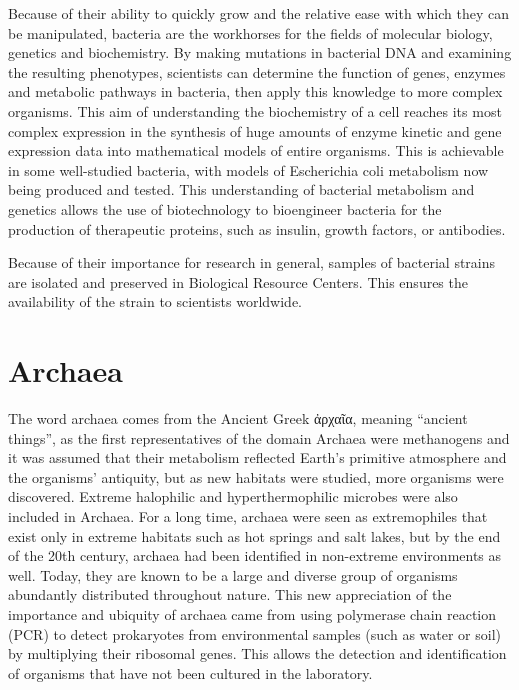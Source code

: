 Because of their ability to quickly grow and the relative ease with which they can be manipulated, bacteria are the workhorses for the fields of molecular biology, genetics and biochemistry. By making mutations in bacterial DNA and examining the resulting phenotypes, scientists can determine the function of genes, enzymes and metabolic pathways in bacteria, then apply this knowledge to more complex organisms. This aim of understanding the biochemistry of a cell reaches its most complex expression in the synthesis of huge amounts of enzyme kinetic and gene expression data into mathematical models of entire organisms. This is achievable in some well-studied bacteria, with models of Escherichia coli metabolism now being produced and tested. This understanding of bacterial metabolism and genetics allows the use of biotechnology to bioengineer bacteria for the production of therapeutic proteins, such as insulin, growth factors, or antibodies.

Because of their importance for research in general, samples of bacterial strains are isolated and preserved in Biological Resource Centers. This ensures the availability of the strain to scientists worldwide.

\hypertarget{archaea}{%
\section{Archaea}\label{archaea}}

The word archaea comes from the Ancient Greek ἀρχαῖα, meaning ``ancient things'', as the first representatives of the domain Archaea were methanogens and it was assumed that their metabolism reflected Earth's primitive atmosphere and the organisms' antiquity, but as new habitats were studied, more organisms were discovered. Extreme halophilic and hyperthermophilic microbes were also included in Archaea. For a long time, archaea were seen as extremophiles that exist only in extreme habitats such as hot springs and salt lakes, but by the end of the 20th century, archaea had been identified in non-extreme environments as well. Today, they are known to be a large and diverse group of organisms abundantly distributed throughout nature. This new appreciation of the importance and ubiquity of archaea came from using polymerase chain reaction (PCR) to detect prokaryotes from environmental samples (such as water or soil) by multiplying their ribosomal genes. This allows the detection and identification of organisms that have not been cultured in the laboratory.

